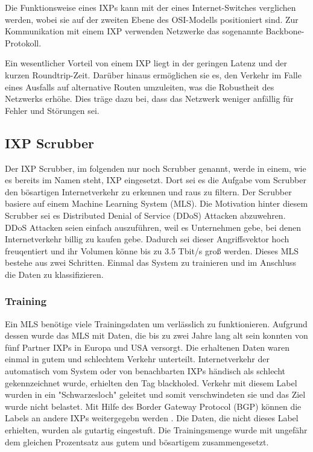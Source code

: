 \documentclass[sigplan,screen]{acmart}
\begin{document}
Die Funktionsweise eines IXPs kann mit der eines Internet-Switches verglichen werden, wobei sie auf der zweiten Ebene des OSI-Modells positioniert sind. Zur Kommunikation mit einem IXP verwenden Netzwerke das sogenannte Backbone-Protokoll.

Ein wesentlicher Vorteil von einem IXP liegt in der geringen Latenz und der kurzen Roundtrip-Zeit. Darüber hinaus ermöglichen sie es, den Verkehr im Falle eines Ausfalls auf alternative Routen umzuleiten, was die Robustheit des Netzwerks erhöhe. Dies träge dazu bei, dass das Netzwerk weniger anfällig für Fehler und Störungen sei. \cite{ixp00}

\subsection{IXP Scrubber}
Der IXP Scrubber, im folgenden nur noch Scrubber genannt, werde in einem, wie es bereits im Namen steht, IXP eingesetzt. Dort sei es die Aufgabe vom Scrubber den bösartigen Internetverkehr zu erkennen und raus zu filtern. Der Scrubber basiere auf einem Machine Learning System (MLS). Die Motivation hinter diesem Scrubber sei es Distributed Denial of Service (DDoS) Attacken abzuwehren. DDoS Attacken seien einfach auszuführen, weil es Unternehmen gebe, bei denen Internetverkehr billig zu kaufen gebe. Dadurch sei dieser Angriffsvektor hoch freuqentiert und ihr Volumen könne bis zu 3.5 Tbit/s groß werden. Dieses MLS bestehe aus zwei Schritten. Einmal das System zu trainieren und im Anschluss die Daten zu klassifizieren.

\subsubsection{Training}
Ein MLS benötige viele Trainingsdaten um verlässlich zu funktionieren. Aufgrund dessen wurde das MLS mit Daten, die bis zu zwei Jahre lang alt sein konnten von fünf Partner IXPs in Europa und USA versorgt. Die erhaltenen Daten waren einmal in gutem und schlechtem Verkehr unterteilt. Internetverkehr der automatisch vom System oder von benachbarten IXPs händisch als schlecht gekennzeichnet wurde, erhielten den Tag blackholed. Verkehr mit diesem Label wurden in ein "Schwarzesloch" geleitet und somit verschwindeten sie und das Ziel wurde nicht belastet. Mit Hilfe des Border Gateway Protocol (BGP) können die Labels an andere IXPs weitergegebn werden \cite{blackhole00}. Die Daten, die nicht dieses Label erhielten, wurden als gutartig eingestuft. Die Trainingsmenge wurde mit ungefähr dem gleichen Prozentsatz aus gutem und bösartigem zusammengesetzt.
\end{document}
